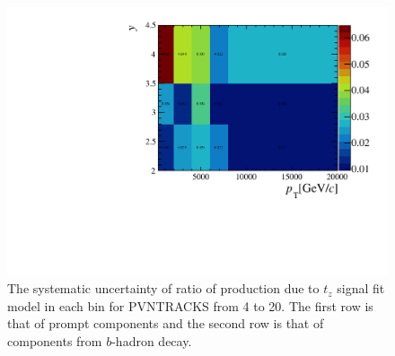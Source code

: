 \begin{figure}[!tbp]
\begin{center}
      \includegraphics[width=0.49\linewidth]{pdf/SysTzPlot/tzsig/n1Errb.pdf}
    \end{center}
    \caption{The systematic uncertainty of ratio of production due to $t_z$ signal fit model in each bin for PVNTRACKS from 4 to 20. The first row is that of prompt components and the second row is that of components from $b$-hadron decay.
      }
    \label{sys_tzsig}
\end{figure}



